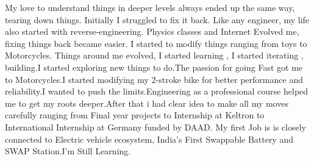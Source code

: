 

\begin{cvparagraph}


My love to understand things in deeper levels always ended up the same way, tearing down things. Initially I struggled to fix it back. Like any engineer, my life also started with reverse-engineering. Physics classes and Internet Evolved me, fixing things back became easier. I started to modify things ranging from toys to Motorcycles. Things around me evolved, I started learning , I started iterating , building.I started exploring new things to do.The passion for going Fast got me to Motorcycles.I started modifying my 2-stroke bike for better performance and reliability.I wanted to push the limits.Engineering as a professional course helped me to get my roots deeper.After that i had clear idea to make all my moves carefully ranging from Final year projects to Internship at Keltron to International Internship at Germany funded by DAAD. My first Job is is closely connected to Electric vehicle ecosystem, India's First Swappable Battery and SWAP Station.I'm Still Learning.

\end{cvparagraph}
